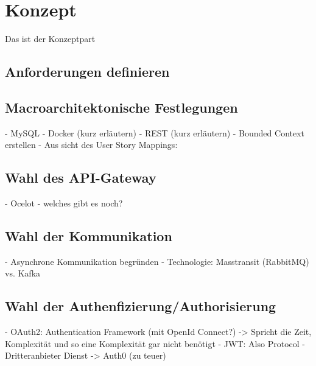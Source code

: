 \section{Konzept}
Das ist der Konzeptpart

\subsection{Anforderungen definieren}

\subsection{Macroarchitektonische Festlegungen}
- MySQL 
- Docker (kurz erläutern)
- REST (kurz erläutern)
- Bounded Context erstellen
- Aus sicht des User Story Mappings: 

\subsection{Wahl des API-Gateway}
- Ocelot 
- welches gibt es noch? 

\subsection{Wahl der Kommunikation}
- Asynchrone Kommunikation begründen 
- Technologie: Masstransit (RabbitMQ) vs. Kafka

\subsection{Wahl der Authenfizierung/Authorisierung}
- OAuth2: Authentication Framework (mit OpenId Connect?) -> Spricht die Zeit, Komplexität und so eine Komplexität gar nicht benötigt 
- JWT: Also Protocol
- Dritteranbieter Dienst -> Auth0 (zu teuer)

